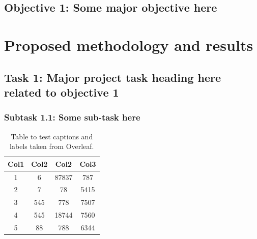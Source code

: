 \subsection*{Objective 1: Some major objective here}

\blindtext







\section{Proposed methodology and results}      %

\blindtext

\subsection{Task 1: Major project task heading here related to objective 1}

\blindtext


\subsubsection*{Subtask 1.1: Some sub-task here}

\blindtext

\begin{table}[ht]
\centering
\begin{tabular}{c c c c} 
\toprule \toprule
Col1 & Col2 & Col2 & Col3 \\ 
\toprule \toprule
1 & 6 & 87837 & 787 \\ 
2 & 7 & 78 & 5415 \\
3 & 545 & 778 & 7507 \\
4 & 545 & 18744 & 7560 \\
5 & 88 & 788 & 6344 \\ 
\bottomrule
\end{tabular}
\caption{Table to test captions and labels taken from Overleaf.}
\label{table:1}
\end{table}


